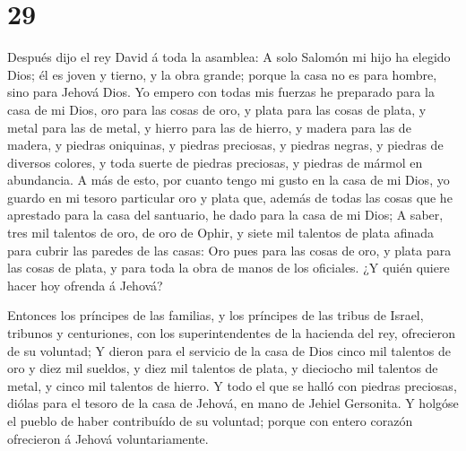 \hypertarget{section-28}{%
\section{29}\label{section-28}}

 Después dijo el rey David á toda la asamblea: A solo
Salomón mi hijo ha elegido Dios; él es joven y tierno, y la obra grande;
porque la casa no es para hombre, sino para Jehová Dios.  Yo
empero con todas mis fuerzas he preparado para la casa de mi Dios, oro
para las cosas de oro, y plata para las cosas de plata, y metal para las
de metal, y hierro para las de hierro, y madera para las de madera, y
piedras oniquinas, y piedras preciosas, y piedras negras, y piedras de
diversos colores, y toda suerte de piedras preciosas, y piedras de
mármol en abundancia.  A más de esto, por cuanto tengo mi
gusto en la casa de mi Dios, yo guardo en mi tesoro particular oro y
plata que, además de todas las cosas que he aprestado para la casa del
santuario, he dado para la casa de mi Dios;  A saber, tres
mil talentos de oro, de oro de Ophir, y siete mil talentos de plata
afinada para cubrir las paredes de las casas:  Oro pues para
las cosas de oro, y plata para las cosas de plata, y para toda la obra
de manos de los oficiales. ¿Y quién quiere hacer hoy ofrenda á Jehová?

 Entonces los príncipes de las familias, y los príncipes de
las tribus de Israel, tribunos y centuriones, con los superintendentes
de la hacienda del rey, ofrecieron de su voluntad;  Y dieron
para el servicio de la casa de Dios cinco mil talentos de oro y diez mil
sueldos, y diez mil talentos de plata, y dieciocho mil talentos de
metal, y cinco mil talentos de hierro.  Y todo el que se
halló con piedras preciosas, diólas para el tesoro de la casa de Jehová,
en mano de Jehiel Gersonita.  Y holgóse el pueblo de haber
contribuído de su voluntad; porque con entero corazón ofrecieron á
Jehová voluntariamente.

